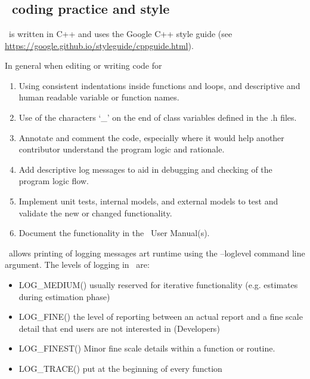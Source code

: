 \section{\label{sec:buildrules}}

\subsection{\CNAME\ coding practice and style}\label{subsec:codepractice}

\CNAME\ is written in C++ and uses the Google C++ style guide (see \url{https://google.github.io/styleguide/cppguide.html}). 

In general when editing or writing code for \CNAME\:

\begin{enumerate}
  \item Using consistent indentations inside functions and loops, and descriptive and human readable variable or function names.
  \item Use of the characters `\_' on the end of class variables defined in the .h files. 
  \item Annotate and comment the code, especially where it would help another contributor understand the program logic and rationale.
  \item Add descriptive log messages to aid in debugging and checking of the program logic flow.
  \item Implement unit tests, internal models, and external models to test and validate the new or changed functionality.
  \item Document the functionality in the \CNAME\ User Manual(s).
\end{enumerate}

\CNAME\ allows printing of logging messages art runtime using the --loglevel command line argument. The levels of logging in \CNAME\ are:

\begin{itemize}
	\item LOG\_MEDIUM()  usually reserved for iterative functionality (e.g. estimates during estimation phase)
	\item LOG\_FINE() the level of reporting between an actual report and a fine scale detail that end users are not interested in (Developers)
	\item LOG\_FINEST() Minor fine scale details within a function or routine.
	\item LOG\_TRACE() put at the beginning of every function
\end{itemize}

